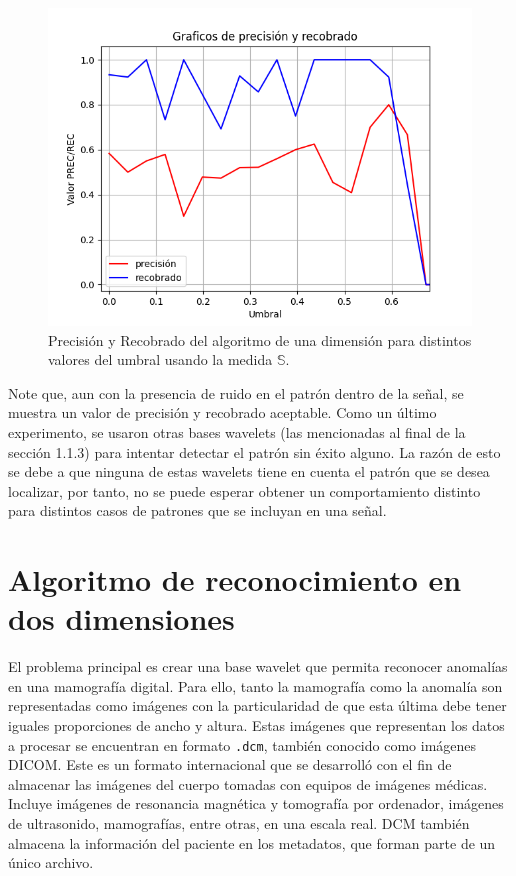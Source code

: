 \begin{figure}[h]
\center
\includegraphics[scale=.45]{Graphics/PrecRec1D.png}
\caption{Precisi\'on y Recobrado del algoritmo de una dimensi\'on para distintos valores del umbral usando la medida $\mathbb{S}$.}
\label{precision-recall-1D}
\end{figure}

\par Note que, aun con la presencia de ruido en el patr\'on dentro de la se\~nal, se muestra un valor de precisi\'on y recobrado aceptable. Como un \'ultimo experimento, se usaron otras bases wavelets (las mencionadas al final de la secci\'on 1.1.3) para intentar detectar el patr\'on sin \'exito alguno. La raz\'on de esto se debe a que ninguna de estas wavelets tiene en cuenta el patr\'on que se desea localizar, por tanto, no se puede esperar obtener un comportamiento distinto para distintos casos de patrones que se incluyan en una se\~nal.

\section{Algoritmo de reconocimiento en dos dimensiones}

\par El problema principal es crear una base wavelet que permita reconocer anomal\'ias en una mamograf\'ia digital. Para ello, tanto la mamograf\'ia como la anomal\'ia son representadas como im\'agenes con la particularidad de que esta \'ultima debe tener iguales proporciones de ancho y altura. Estas im\'agenes que representan los datos a procesar se encuentran en formato \texttt{.dcm}, tambi\'en conocido como im\'agenes DICOM. Este es un formato internacional que se desarrolló con el fin de almacenar las imágenes del cuerpo tomadas con equipos de imágenes médicas. Incluye imágenes de resonancia magnética y tomografía por ordenador, imágenes de ultrasonido, mamograf\'ias, entre otras, en una escala real. DCM también almacena la información del paciente en los metadatos, que forman parte de un único archivo.\\

